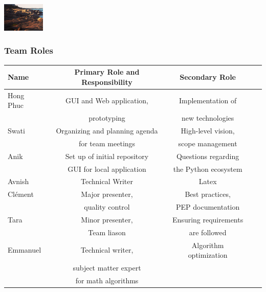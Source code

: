 \documentclass{beamer}
\begin{document}
\begin{frame}
\hfil\hfil\hfil\includegraphics[width=2cm]{Screen Shot}\newline
\null\hfil\hfil{}
\hfil\hfil\makebox[2cm]{\[x^y\]}
\hfil\hfil{}\newline
\end{frame}



  \begin{frame}
\frametitle{Team Roles}
\small
\begin{table}
\begin{tabular}{l | c | c | c | c }
Name & Primary Role and Responsibility & Secondary Role \\
\hline
Hong Phuc & GUI and Web application,& Implementation of\\
& prototyping & new technologies\\
\hline
Swati & Organizing and planning agenda& High-level vision, \\
& for team meetings & scope management\\
\hline
Anik & Set up of initial repository& Questions regarding\\
& GUI for local application & the Python ecosystem\\
\hline
Avnish & Technical Writer & Latex \\
\hline
Clément & Major presenter, & Best practices, \\
& quality control  & PEP documentation\\
\hline
Tara & Minor presenter, & Ensuring requirements \\
& Team liason  & are followed\\
\hline
Emmanuel & Technical writer, &  Algorithm optimization\\
& subject matter expert  & \\
& for math algorithms  & \\
\end{tabular}
\end{table}
\end{frame}
\end{document}
